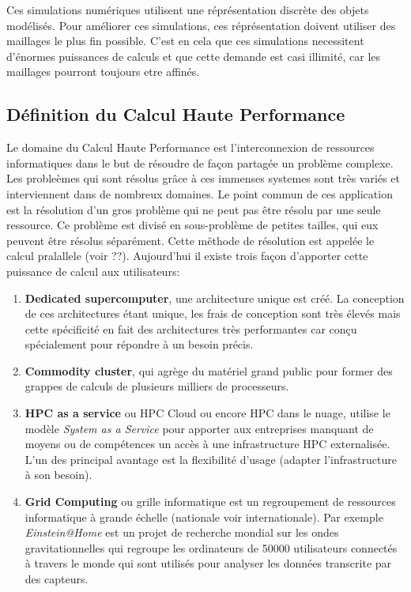 Ces simulations numériques utilisent une réprésentation discrète des objets modélisés. Pour améliorer ces simulations, ces réprésentation doivent utiliser des maillages le plus fin possible. C'est en cela que ces simulations necessitent d'énormes puissances de calculs et que cette demande est casi illimité, car les maillages pourront toujours etre affinés. 



\subsection{Définition du Calcul Haute Performance}
 
Le domaine du Calcul Haute Performance est l'interconnexion de ressources informatiques dans le but de résoudre de façon partagée un problème complexe. Les probleèmes qui sont résolus grâce à ces immenses systemes sont très variés et interviennent dans de nombreux domaines. Le point commun de ces application est la résolution d'un gros problème qui ne peut pas être résolu par une seule ressource. Ce problème est divisé en sous-problème de petites tailles, qui eux peuvent être résolus séparément. Cette mêthode de résolution est appelée le calcul pralallele (voir ??). 
Aujourd'hui il existe trois façon d'apporter cette puissance de calcul aux utilisateurs:
\begin{enumerate}
\item \textbf{Dedicated supercomputer}, une architecture unique est créé. La conception de ces architectures étant unique, les frais de conception sont très élevés mais cette spécificité en fait des architectures très performantes car conçu spécialement pour répondre à un besoin précis. 
\item \textbf{Commodity cluster}, qui agrège du matériel grand public pour former des grappes de calculs de plusieurs milliers de processeurs.
\item \textbf{HPC as a service} ou HPC Cloud ou encore HPC dans le nuage,  utilise le modèle \textit{System as a Service} pour apporter aux entreprises manquant de moyens ou de compétences un accès à une infrastructure HPC externalisée. L'un des principal avantage est la flexibilité d'usage (adapter l'infrastructure à son besoin). 

\item \textbf{Grid Computing} ou grille informatique est un regroupement de ressources informatique à grande échelle (nationale voir internationale). Par exemple \textit{Einstein@Home} \cite{PhysRevD.80.042003} est un projet de recherche mondial sur les ondes gravitationnelles  qui regroupe les ordinateurs de 50000 utilisateurs connectés à travers le monde qui sont utilisés pour  analyser les données transcrite par des capteurs.

\end{enumerate}

